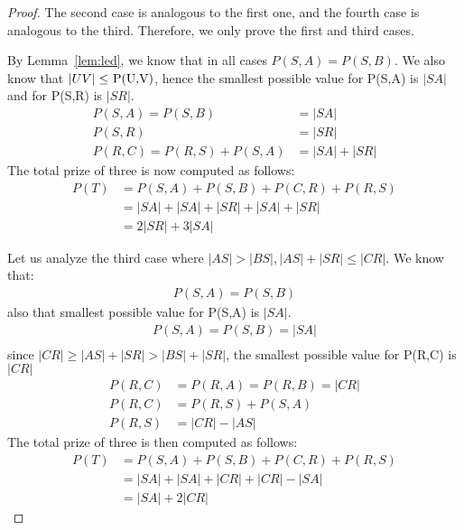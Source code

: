 \documentclass[12pt]{article}
\newcommand{\Price}[2]{P(#1,#2)}
\newcommand{\Ptotal}[1]{P(#1)}
\newtheorem{proof}{Proof}
\begin{document}
	\begin{proof}
		The second case is analogous to the first one, and the fourth case is analogous to the third. Therefore, we only prove the first and third cases.
		
		By Lemma~\ref{lem:led}, we know that in all cases \( \Price{S}{A} = \Price{S}{B} \).
		We also know that \( |UV| \leq  $ \Price{U}{V}$ \), hence the smallest possible value for \Price{S}{A} is \(|SA|\) and for \Price{S}{R} is \(|SR|\).
		\begin{align*}	
			\Price{S}{A} = \Price{S}{B} &= |SA| \\
			\Price{S}{R} &= |SR| \\
			\Price{R}{C} = \Price{R}{S} + \Price{S}{A} &= |SA| + |SR|
		\end{align*}
		The total prize of three is now computed as follows:
		\begin{align*}	
			\Ptotal{T} &= \Price{S}{A} + \Price{S}{B} + \Price{C}{R} + \Price{R}{S} \\
			&= |SA| + |SA| + |SR| + |SA| + |SR| \\
			&= 2 |SR| + 3 |SA|
		\end{align*}
	
		Let us analyze the third case where \( |AS| > |BS|, |AS|+|SR| \leq |CR| \).
		We know that:
		\begin{align*}
			\Price{S}{A} = \Price{S}{B}
		\end{align*}
		also that smallest possible value for \Price{S}{A} is \(|SA|\).
		\begin{align*}	
			\Price{S}{A} = \Price{S}{B} = |SA| \\
		\end{align*}
		since \(|CR| \geq |AS|+|SR| > |BS|+|SR| \), the smallest possible value for \Price{R}{C} is \(|CR|\)
		\begin{align*}
		 	\Price{R}{C} &= \Price{R}{A} = \Price{R}{B} = |CR| \\
		 	\Price{R}{C} &= \Price{R}{S} + \Price{S}{A} \\
		 	\Price{R}{S} &= |CR| - |AS|
		\end{align*}
		The total prize of three is then computed as follows:
		\begin{align*}	
			\Ptotal{T} &= \Price{S}{A} + \Price{S}{B} + \Price{C}{R} + \Price{R}{S} \\
			&= |SA| + |SA| + |CR| + |CR| - |SA| \\
			&= |SA| + 2 |CR|
		\end{align*}
	\end{proof}	 
		 
\end{document}
